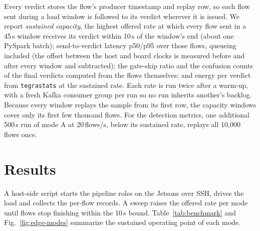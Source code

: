 \documentclass[runningheads]{llncs}
\begin{document}
Every verdict stores the flow's producer timestamp and replay row, so each flow sent during a load window is followed to its verdict wherever it is issued. We report \emph{sustained capacity}, the highest offered rate at which every flow sent in a 45\,s window receives its verdict within 10\,s of the window's end (about one PySpark batch); send-to-verdict latency p50/p95 over those flows, queueing included (the offset between the host and board clocks is measured before and after every window and subtracted); the gate-skip ratio and the confusion counts of the final verdicts computed from the flows themselves; and energy per verdict from \texttt{tegrastats} at the sustained rate. Each rate is run twice after a warm-up, with a fresh Kafka consumer group per run so no run inherits another's backlog. Because every window replays the sample from its first row, the capacity windows cover only its first few thousand flows. For the detection metrics, one additional 500\,s run of mode A at 20\,flows/s, below its sustained rate, replays all 10{,}000 flows once.

\section{Results}
\label{sec:benchmark-results}

A host-side script starts the pipeline roles on the Jetsons over SSH, drives the load and collects the per-flow records. A sweep raises the offered rate per mode until flows stop finishing within the 10\,s bound. Table~\ref{tab:benchmark} and Fig.~\ref{fig:edge-modes} summarize the sustained operating point of each mode.
\end{document}
